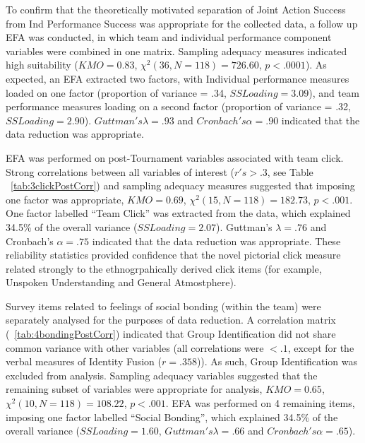 To confirm that the theoretically motivated separation of Joint Action Success from Ind Performance Success was appropriate for the collected data, a follow up EFA was conducted, in which team and individual performance component variables were combined in one matrix. Sampling adequacy measures indicated high suitability ($KMO = 0.83$, $\chi^2(36, N = 118) = 726.60$, $p < .0001$).  As expected, an EFA extracted two factors, with Individual performance measures loaded on one factor (proportion of variance = .34, $SS Loading = 3.09$), and team performance measures loading on a second factor (proportion of variance = .32, $SS Loading = 2.90$). $Guttman's \lambda =.93$ and $Cronbach's \alpha = .90$ indicated that the data reduction was appropriate.


EFA was performed on post-Tournament variables associated with team click. Strong correlations between all variables of interest ($r's > .3$, see Table ~\ref{tab:3clickPostCorr}) and sampling adequacy measures suggested that imposing one factor was appropriate, $KMO =  0.69$, $\chi^2(15, N = 118) = 182.73$, $p < .001$.  One factor labelled ``Team Click'' was extracted from the data, which explained 34.5\% of the overall variance ($SS Loading = 2.07$).  Guttman's $\lambda =.76$ and Cronbach's $\alpha = .75$ indicated that the data reduction was appropriate.  These reliability statistics provided confidence that the novel pictorial click measure related strongly to the ethnogrpahically derived click items (for example, Unspoken Understanding and General Atmostphere).



Survey items related to feelings of social bonding (within the team) were separately analysed for the purposes of data reduction. A correlation matrix (~\ref{tab:4bondingPostCorr}) indicated that Group Identification did not share common variance with other variables (all correlations were $<.1$, except for the verbal measures of Identity Fusion ($r =.358$)). As such,  Group Identification was excluded from analysis.  Sampling adequacy variables suggested that the remaining subset of variables were appropriate for analysis, $KMO = 0.65$, $\chi^2(10, N = 118) = 108.22$, $p < .001$.  EFA was performed on 4 remaining items, imposing one factor labelled ``Social Bonding'', which explained 34.5\% of the overall variance ($SS Loading = 1.60$, $Guttman's \lambda =.66$ and $Cronbach's \alpha = .65$).

